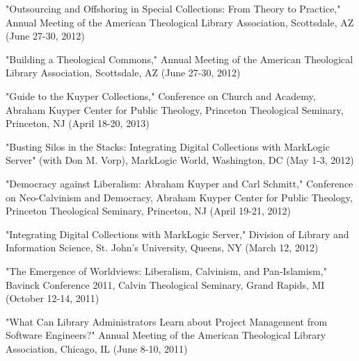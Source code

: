 \documentclass[10pt]{res} %
\begin{document}
\begin{resume}
\begin{hangparas}{.25in}{1}"Outsourcing and Offshoring in Special Collections: From Theory to Practice," Annual Meeting of the American Theological Library Association, Scottsdale, AZ (June 27-30, 2012)\end{hangparas}

\begin{hangparas}{.25in}{1}"Building a Theological Commons," Annual Meeting of the American Theological Library Association, Scottsdale, AZ (June 27-30, 2012)\end{hangparas}

\begin{hangparas}{.25in}{1}"Guide to the Kuyper Collections," Conference on Church and Academy, Abraham Kuyper Center for Public Theology, Princeton Theological Seminary, Princeton, NJ (April 18-20, 2013)\end{hangparas}

\begin{hangparas}{.25in}{1}"Busting Silos in the Stacks: Integrating Digital Collections with MarkLogic Server" (with Don M. Vorp), MarkLogic World, Washington, DC (May 1-3, 2012)\end{hangparas}

\begin{hangparas}{.25in}{1}"Democracy against Liberalism: Abraham Kuyper and Carl Schmitt," Conference on Neo-Calvinism and Democracy, Abraham Kuyper Center for Public Theology, Princeton Theological Seminary, Princeton, NJ (April 19-21, 2012)\end{hangparas}

\begin{hangparas}{.25in}{1}"Integrating Digital Collections with MarkLogic Server," Division of Library and Information Science, St. John’s University, Queens, NY (March 12, 2012)\end{hangparas}

\begin{hangparas}{.25in}{1}"The Emergence of Worldviews: Liberalism, Calvinism, and Pan-Islamism," Bavinck Conference 2011, Calvin Theological Seminary, Grand Rapids, MI (October 12-14, 2011)\end{hangparas}

\begin{hangparas}{.25in}{1}"What Can Library Administrators Learn about Project Management from Software Engineers?" Annual Meeting of the American Theological Library Association, Chicago, IL (June 8-10, 2011)\end{hangparas}


\end{resume}
\end{document}
